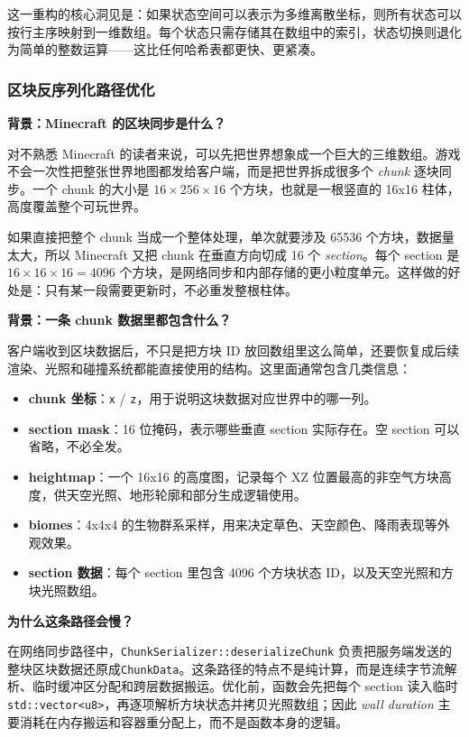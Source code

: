 这一重构的核心洞见是：如果状态空间可以表示为多维离散坐标，则所有状态可以按行主序映射到一维数组。每个状态只需存储其在数组中的索引，状态切换则退化为简单的整数运算——这比任何哈希表都更快、更紧凑。

\subsubsection{区块反序列化路径优化}

\textbf{背景：Minecraft 的区块同步是什么？}

对不熟悉 Minecraft 的读者来说，可以先把世界想象成一个巨大的三维数组。游戏不会一次性把整张世界地图都发给客户端，而是把世界拆成很多个 \emph{chunk} 逐块同步。一个 chunk 的大小是 $16 \times 256 \times 16$ 个方块，也就是一根竖直的 16x16 柱体，高度覆盖整个可玩世界。

如果直接把整个 chunk 当成一个整体处理，单次就要涉及 65536 个方块，数据量太大，所以 Minecraft 又把 chunk 在垂直方向切成 16 个 \emph{section}。每个 section 是 $16 \times 16 \times 16 = 4096$ 个方块，是网络同步和内部存储的更小粒度单元。这样做的好处是：只有某一段需要更新时，不必重发整根柱体。

\textbf{背景：一条 chunk 数据里都包含什么？}

客户端收到区块数据后，不只是把方块 ID 放回数组里这么简单，还要恢复成后续渲染、光照和碰撞系统都能直接使用的结构。这里面通常包含几类信息：

\begin{itemize}
    \item \textbf{chunk 坐标}：\texttt{x} / \texttt{z}，用于说明这块数据对应世界中的哪一列。
    \item \textbf{section mask}：16 位掩码，表示哪些垂直 section 实际存在。空 section 可以省略，不必全发。
    \item \textbf{heightmap}：一个 16x16 的高度图，记录每个 XZ 位置最高的非空气方块高度，供天空光照、地形轮廓和部分生成逻辑使用。
    \item \textbf{biomes}：4x4x4 的生物群系采样，用来决定草色、天空颜色、降雨表现等外观效果。
    \item \textbf{section 数据}：每个 section 里包含 4096 个方块状态 ID，以及天空光照和方块光照数组。
\end{itemize}

\textbf{为什么这条路径会慢？}

在网络同步路径中，\texttt{ChunkSerializer::deserializeChunk} 负责把服务端发送的整块区块数据还原成\texttt{ChunkData}。这条路径的特点不是纯计算，而是连续字节流解析、临时缓冲区分配和跨层数据搬运。优化前，函数会先把每个 section 读入临时\texttt{std::vector<u8>}，再逐项解析方块状态并拷贝光照数组；因此 \textit{wall duration} 主要消耗在内存搬运和容器重分配上，而不是函数本身的逻辑。

